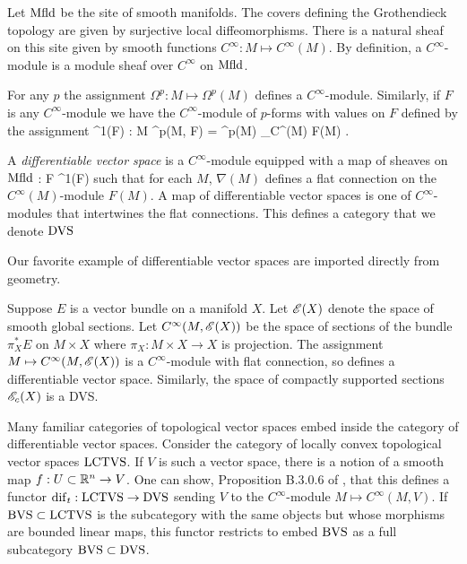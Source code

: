 \documentclass[10pt]{amsart}
\begin{document}
Let ${\rm Mfld}$ be the site of smooth manifolds.
The covers defining the Grothendieck topology are given by surjective local diffeomorphisms.
There is a natural sheaf on this site given by smooth functions $C^\infty : M \mapsto C^\infty(M)$. 
By definition, a $C^\infty$-module is a module sheaf over $C^\infty$ on ${\rm Mfld}$. 

For any $p$ the assignment $\Omega^p : M \mapsto \Omega^p (M)$ defines a $C^\infty$-module.
Similarly, if $F$ is any $C^\infty$-module we have the $C^\infty$-module of $p$-forms with values on $F$ defined by the assignment 
\ben
\Omega^1(F) : M  \mapsto \Omega^p(M, F) = \Omega^p(M) \tensor_{C^\infty(M)} F(M) .
\een

\begin{dfn}
A {\em differentiable vector space} is a $C^\infty$-module equipped with a map of sheaves on ${\rm Mfld}$
\ben
\nabla : F \to \Omega^1(F) 
\een 
such that for each $M$, $\nabla(M)$ defines a flat connection on the $C^\infty(M)$-module $F(M)$. 
A map of differentiable vector spaces is one of $C^\infty$-modules that intertwines the flat connections. 
This defines a category that we denote ${\rm DVS}$ 
\end{dfn}

Our favorite example of differentiable vector spaces are imported directly from geometry.

\begin{eg}
Suppose $E$ is a vector bundle on a manifold $X$. 
Let $\mathscr E(X)$ denote the space of smooth global sections.
Let $C^\infty(M, \mathscr E(X))$ be the space of sections of the bundle $\pi_X^*E$ on $M \times X$ where $\pi_X : M \times X \to X$ is projection. 
The assignment $M \mapsto C^\infty(M , \mathscr E(X))$ is a $C^\infty$-module with flat connection, so defines a differentiable vector space.
Similarly, the space of compactly supported sections $\mathscr E_c(X)$ is a DVS. 
\end{eg}

Many familiar categories of topological vector spaces embed inside the category of differentiable vector spaces. 
Consider the category of locally convex topological vector spaces ${\rm LCTVS}$.
If $V$ is such a vector space, there is a notion of a smooth map $f : U \subset \mathbb R^n \to V$.
One can show, Proposition B.3.0.6 of \cite{CG1}, that this defines a functor ${\rm dif}_t : {\rm LCTVS} \to {\rm DVS}$ sending $V$ to the $C^\infty$-module $M \mapsto C^\infty(M, V)$.
If ${\rm BVS} \subset {\rm LCTVS}$ is the subcategory with the same objects but whose morphisms are bounded linear maps, this functor restricts to embed ${\rm BVS}$ as a full subcategory ${\rm BVS} \subset {\rm DVS}$. 
\end{document}
